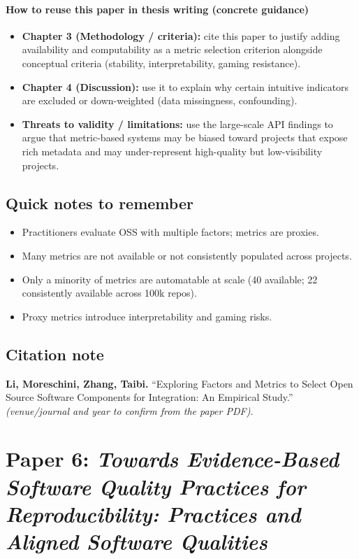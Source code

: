\documentclass[11pt,a4paper]{article}
\begin{document}
\paragraph{How to reuse this paper in thesis writing (concrete guidance)}
\begin{itemize}[leftmargin=*]
  \item \textbf{Chapter 3 (Methodology / criteria):} cite this paper to justify adding availability and computability as a metric selection criterion alongside conceptual criteria (stability, interpretability, gaming resistance).
  \item \textbf{Chapter 4 (Discussion):} use it to explain why certain intuitive indicators are excluded or down-weighted (data missingness, confounding).
  \item \textbf{Threats to validity / limitations:} use the large-scale API findings to argue that metric-based systems may be biased toward projects that expose rich metadata and may under-represent high-quality but low-visibility projects.
\end{itemize}

\subsection{Quick notes to remember}
\begin{itemize}[leftmargin=*]
  \item Practitioners evaluate OSS with multiple factors; metrics are proxies.
  \item Many metrics are not available or not consistently populated across projects.
  \item Only a minority of metrics are automatable at scale (40 available; 22 consistently available across 100k repos).
  \item Proxy metrics introduce interpretability and gaming risks.
\end{itemize}

\subsection{Citation note}
\noindent\textbf{Li, Moreschini, Zhang, Taibi.} ``Exploring Factors and Metrics to Select Open Source Software Components for Integration: An Empirical Study.'' \textit{(venue/journal and year to confirm from the paper PDF).}

\newpage
\section{Paper 6: \textit{Towards Evidence-Based Software Quality Practices for Reproducibility: Practices and Aligned Software Qualities}}
\end{document}
